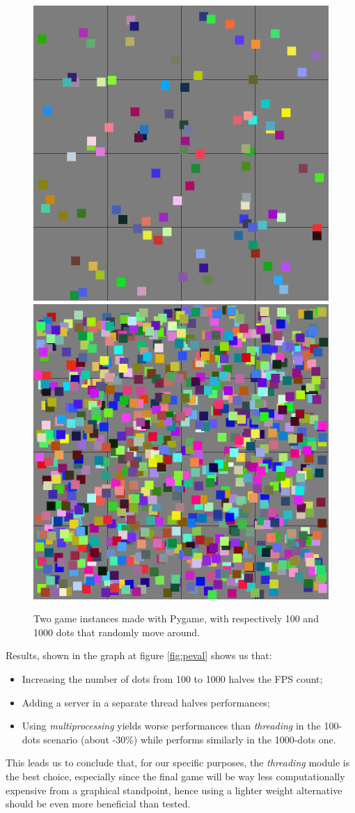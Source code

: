 \begin{figure}[h]
  \centering
  \includegraphics[width=.4\linewidth]{images/100dots.png}
  \hspace{.05\linewidth}
  \includegraphics[width=.4\linewidth]{images/1000dots.png}
  
  \caption{Two game instances made with Pygame, with respectively 100 and 1000 dots that randomly move around.}
  \label{fig:randomdots}
\end{figure}

Results, shown in the graph at figure \ref{fig:peval} shows us that: 

\begin{itemize}
    \item Increasing the number of dots from 100 to 1000 halves the FPS count;
    \item Adding a server in a separate thread halves performances;
    \item Using \textit{multiprocessing} yields worse performances than \textit{threading} in the 100-dots scenario (about -30\%) while performs similarly in the 1000-dots one.
\end{itemize}

This leads us to conclude that, for our specific purposes, the \textit{threading} module is the best choice, especially since the final game will be way less computationally expensive from a graphical standpoint, hence using a lighter weight alternative should be even more beneficial than tested.

